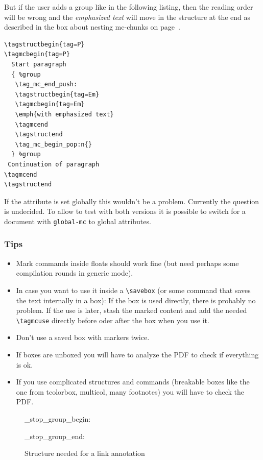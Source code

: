 \documentclass[DIV=12,parskip=half-,bibliography=totoc]{scrartcl}
\newcommand\PDF{PDF}
\begin{document}
But if the user adds a group like in the following listing, then the reading order will be wrong and the \emph{emphasized text} will move in the structure at the end as described in the box about nesting
mc-chunks on page~\pageref{mc-nesting}.

\begin{lstlisting}
\tagstructbegin{tag=P}
\tagmcbegin{tag=P}
  Start paragraph
  { %group
   \tag_mc_end_push:
   \tagstructbegin{tag=Em}
   \tagmcbegin{tag=Em}
   \emph{with emphasized text}
   \tagmcend
   \tagstructend
   \tag_mc_begin_pop:n{}
  } %group
 Continuation of paragraph
\tagmcend
\tagstructend
\end{lstlisting}

If the attribute is set globally this wouldn't be a problem. Currently the question is undecided.
To allow to test with both versions it is possible to switch for a document with \texttt{global-mc} to global attributes.



\subsubsection{Tips}

\begin{itemize}
\item Mark commands inside floats should work fine (but need perhaps some compilation rounds in generic mode).

\item In case you want to use it inside a \verb+\savebox+ (or some command that saves the text internally in a box): If the box is used directly, there is probably no problem. If the use is later, stash the marked content and add the needed \verb+\tagmcuse+ directly  before oder after the box when you use it.

\item Don't use a saved box with markers twice.
\item If boxes are unboxed you will have to analyze the \PDF{} to check if everything is ok.
\item If you use complicated structures and commands (breakable boxes like the one from tcolorbox, multicol, many footnotes) you will have to check the \PDF{}.
 \end{itemize}


\begin{figure}
\tagpdfparaOff

\ExplSyntaxOn
\tag_stop_group_begin:
\ExplSyntaxOff

\ExplSyntaxOn
\tag_stop_group_end:
\ExplSyntaxOff
\tagmcend\tagstructend

\caption{Structure needed for a link annotation}\label{fig:linkannot}
\tagmcend\tagstructend

\end{figure}
\end{document}
